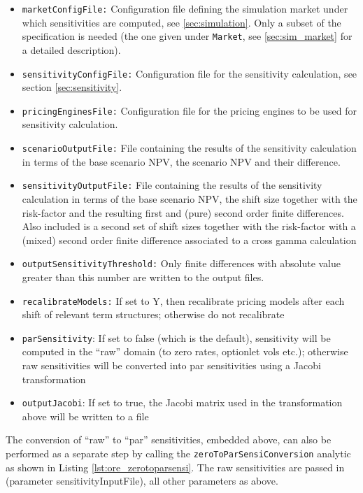 {\begin{itemize}
\item {\tt marketConfigFile:} Configuration file defining the simulation market under which sensitivities are computed,
  see \ref{sec:simulation}. Only a subset of the specification is needed (the one given under {\tt Market}, see
  \ref{sec:sim_market} for a detailed description).
\item {\tt sensitivityConfigFile:} Configuration file  for the sensitivity calculation, see section \ref{sec:sensitivity}.
\item {\tt pricingEnginesFile:} Configuration file for the pricing engines to be used for sensitivity calculation.
\item {\tt scenarioOutputFile:} File containing the results of the sensitivity calculation in terms of the base scenario
  NPV, the scenario NPV and their difference.
\item {\tt sensitivityOutputFile:} File containing the results of the sensitivity calculation in terms of the base scenario
  NPV, the shift size together with the risk-factor and the resulting first and (pure) second order finite differences.
  Also included is a second set of shift sizes together with the risk-factor with a (mixed) second order finite difference associated to a cross gamma calculation
\item {\tt outputSensitivityThreshold:} Only finite differences with absolute value greater than this number are written
  to the output files.
\item {\tt recalibrateModels:} If set to Y, then recalibrate pricing models after each shift of relevant term structures; otherwise do not recalibrate
\item {\tt parSensitivity}: If set to false (which is the default), sensitivity will be computed in the ``raw'' domain (to zero rates, optionlet vols etc.); otherwise raw sensitivities will be converted into par sensitivities using a Jacobi transformation
\item {\tt outputJacobi}: If set to true, the Jacobi matrix used in the transformation above will be written to a file 
\end{itemize}

The conversion of ``raw'' to ``par'' sensitivities, embedded above, can also be performed as a
separate step by calling the {\tt zeroToParSensiConversion} analytic as shown in Listing
\ref{lst:ore_zerotoparsensi}. The raw sensitivities are passed in (parameter sensitivityInputFile),
all other parameters as above.

}
